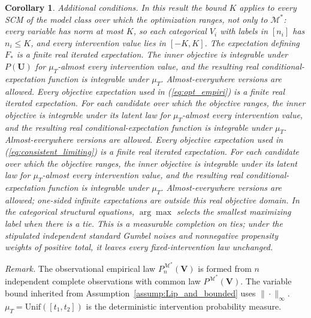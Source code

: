 \documentclass[12pt]{article}
\theoremstyle{plain}
\newtheorem{corollary}[theorem]{Corollary}
\theoremstyle{definition}
\theoremstyle{remark}
\begin{document}
\begin{corollary}
\emph{Additional conditions.} In this result the bound $K$ applies to every SCM of the model class over which the optimization ranges, not only to $\mathcal M^*$: every variable has norm at most $K$, so each categorical $V_i$ with labels in $[n_i]$ has $n_i\leq K$, and every intervention value lies in $[-K,K]$. The expectation defining $F_*$ is a finite real iterated expectation. The inner objective is integrable under $P(\boldsymbol U)$ for $\mu_T$-almost every intervention value, and the resulting real conditional-expectation function is integrable under $\mu_T$. Almost-everywhere versions are allowed. Every objective expectation used in (\ref{eq:opt_empiri}) is a finite real iterated expectation. For each candidate over which the objective ranges, the inner objective is integrable under its latent law for $\mu_T$-almost every intervention value, and the resulting real conditional-expectation function is integrable under $\mu_T$. Almost-everywhere versions are allowed. Every objective expectation used in (\ref{eq:consistent_limiting}) is a finite real iterated expectation. For each candidate over which the objective ranges, the inner objective is integrable under its latent law for $\mu_T$-almost every intervention value, and the resulting real conditional-expectation function is integrable under $\mu_T$. Almost-everywhere versions are allowed; one-sided infinite expectations are outside this real objective domain. In the categorical structural equations, $\arg\max$ selects the smallest maximizing label when there is a tie. This is a measurable completion on ties; under the stipulated independent standard Gumbel noises and nonnegative propensity weights of positive total, it leaves every fixed-intervention law unchanged.
\end{corollary}

\noindent\textit{Remark.} The observational empirical law $P_n^{\mathcal M^*}(\boldsymbol V)$ is formed from $n$ independent complete observations with common law $P^{\mathcal M^*}(\boldsymbol V)$. The variable bound inherited from Assumption~\ref{assump:Lip_and_bounded} uses $\|\cdot\|_\infty$. $\mu_T=\text{Unif}([t_1,t_2])$ is the deterministic intervention probability measure.
\end{document}
